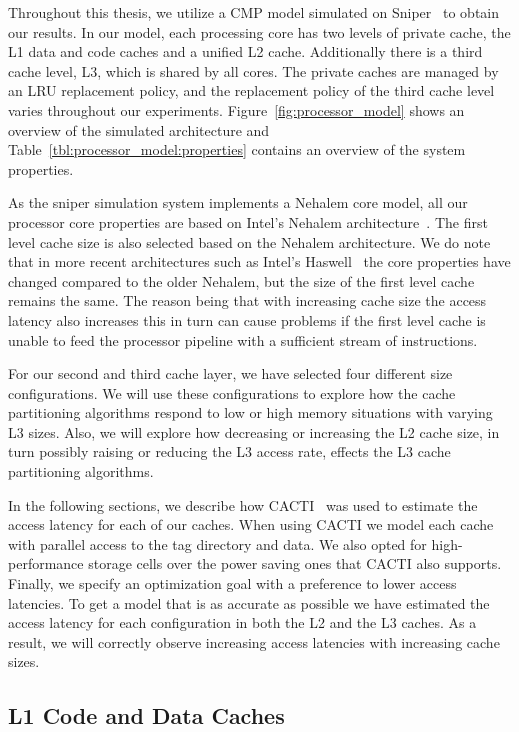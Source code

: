 Throughout this thesis, we utilize a CMP model simulated on Sniper~\cite{Carlson2011a} to obtain our results. 
In our model, each processing core has two levels of private cache, the L1 data and code caches and a unified L2 cache.
Additionally there is a third cache level, L3, which is shared by all cores. 
The private caches are managed by an LRU replacement policy, and the replacement policy of the third cache level varies throughout our experiments.
Figure~\ref{fig:processor_model} shows an overview of the simulated architecture and Table~\ref{tbl:processor_model:properties} contains an overview of the system properties.

As the sniper simulation system implements a Nehalem core model, all our processor core properties are based on Intel's Nehalem architecture~\cite{Thomadakis2011}. 
The first level cache size is also selected based on the Nehalem architecture. 
We do note that in more recent architectures such as Intel's Haswell~\cite{Jain2013} the core properties have changed compared to the older Nehalem, but the size of the first level cache remains the same.
The reason being that with increasing cache size the access latency also increases this in turn can cause problems if the first level cache is unable to feed the processor pipeline with a sufficient stream of instructions.

For our second and third cache layer, we have selected four different size configurations. 
We will use these configurations to explore how the cache partitioning algorithms respond to low or high memory situations with varying L3 sizes.
Also, we will explore how decreasing or increasing the L2 cache size, in turn possibly raising or reducing the L3 access rate, effects the L3 cache partitioning algorithms.

In the following sections, we describe how CACTI~ was used to estimate the access latency for each of our caches. 
When using CACTI we model each cache with parallel access to the tag directory and data.
We also opted for high-performance storage cells over the power saving ones that CACTI also supports.
Finally, we specify an optimization goal with a preference to lower access latencies.
To get a model that is as accurate as possible we have estimated the access latency for each configuration in both the L2 and the L3 caches.
As a result, we will correctly observe increasing access latencies with increasing cache sizes.


\subsection{L1 Code and Data Caches}

